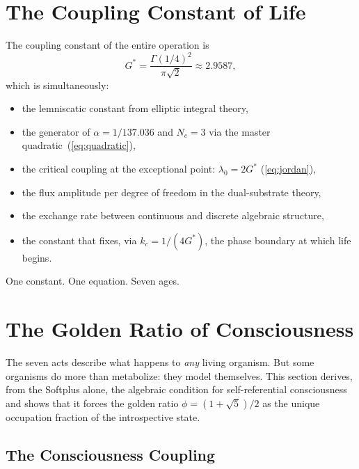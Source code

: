 \documentclass[12pt, letterpaper]{article}
\theoremstyle{plain}
\theoremstyle{definition}
\theoremstyle{remark}
\newcommand{\Gstar}{{G^{*}}}              %
\begin{document}
\section{The Coupling Constant of Life}
\label{sec:coupling}

The coupling constant of the entire operation is
\begin{equation}\label{eq:Gstar_final}
  \Gstar = \frac{\Gamma(1/4)^2}{\pi\sqrt{2}} \approx 2.9587,
\end{equation}
which is simultaneously:
\begin{itemize}[leftmargin=1.5em]
  \item the lemniscatic constant from elliptic integral theory,
  \item the generator of $\alpha = 1/137.036$ and $N_c = 3$ via the master quadratic~(\ref{eq:quadratic}),
  \item the critical coupling at the exceptional point: $\lambda_0 = 2\Gstar$ (\ref{eq:jordan}),
  \item the flux amplitude per degree of freedom in the dual-substrate theory,
  \item the exchange rate between continuous and discrete algebraic structure,
  \item the constant that fixes, via $k_c = 1/(4\Gstar)$, the phase boundary at which life begins.
\end{itemize}

\medskip
\noindent
One constant. One equation. Seven ages.


\section{The Golden Ratio of Consciousness}
\label{sec:golden}

The seven acts describe what happens to \emph{any} living organism. But some organisms do more than metabolize: they model themselves. This section derives, from the Softplus alone, the algebraic condition for self-referential consciousness and shows that it forces the golden ratio $\phi = (1+\sqrt{5})/2$ as the unique occupation fraction of the introspective state.

\subsection{The Consciousness Coupling}
\end{document}
